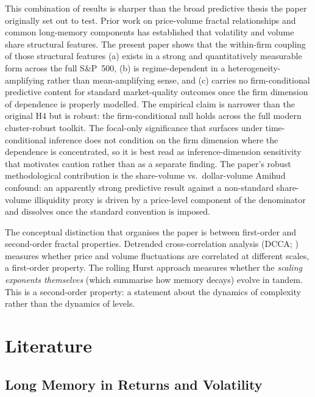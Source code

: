 \documentclass[preprint,12pt,authoryear]{elsarticle}
\begin{document}
This combination of results is sharper than the broad predictive thesis the paper originally set out to test. Prior work on price-volume fractal relationships \citep{podobnik2009cross} and common long-memory components \citep{bollerslev1999equity} has established that volatility and volume share structural features. The present paper shows that the within-firm coupling of those structural features (a) exists in a strong and quantitatively measurable form across the full S\&P~500, (b) is regime-dependent in a heterogeneity-amplifying rather than mean-amplifying sense, and (c) carries no firm-conditional predictive content for standard market-quality outcomes once the firm dimension of dependence is properly modelled. The empirical claim is narrower than the original H4 but is robust: the firm-conditional null holds across the full modern cluster-robust toolkit. The focal-only significance that surfaces under time-conditional inference does not condition on the firm dimension where the dependence is concentrated, so it is best read as inference-dimension sensitivity that motivates caution rather than as a separate finding. The paper's robust methodological contribution is the share-volume vs.\ dollar-volume Amihud confound: an apparently strong predictive result against a non-standard share-volume illiquidity proxy is driven by a price-level component of the denominator and dissolves once the standard convention is imposed.

The conceptual distinction that organises the paper is between first-order and second-order fractal properties. Detrended cross-correlation analysis (DCCA; \citealp{podobnik2008detrended}) measures whether price and volume fluctuations are correlated at different scales, a first-order property. The rolling Hurst approach measures whether the \emph{scaling exponents themselves} (which summarise how memory decays) evolve in tandem. This is a second-order property: a statement about the dynamics of complexity rather than the dynamics of levels.

\section{Literature}
\label{sec:literature}

\subsection{Long Memory in Returns and Volatility}
\end{document}

